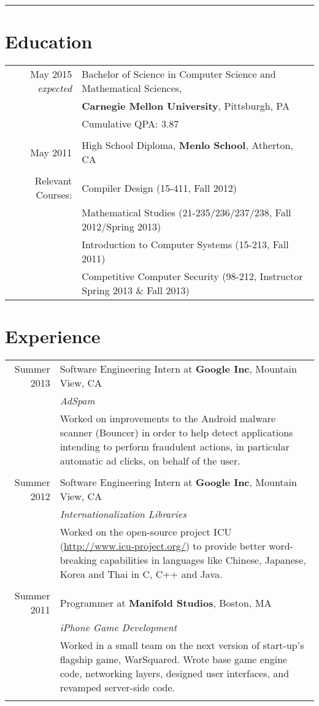 \documentclass[10pt]{article}
\newcommand{\job}[6]{#1 & #2 at \textbf{#3}, #4 \\ & \emph{#5} \\ & \footnotesize{#6}\\ \multicolumn{2}{c}{}\\ }
\begin{document}
\pagestyle{empty}
\par{\bigskip\par}
\hrule
\par{\par}

\section{Education}
\begin{tabular}{rl}
May 2015 {\em expected} & Bachelor of Science in Computer Science and Mathematical Sciences, 
\\ & \textbf{Carnegie Mellon University}, Pittsburgh, PA\\
& Cumulative QPA: 3.87 \\
 &\\
May 2011 & High School Diploma,
\textbf{Menlo School}, Atherton, CA\\
 &\\
Relevant Courses: & Compiler Design (15-411, Fall 2012) \\
& Mathematical Studies (21-235/236/237/238, Fall 2012/Spring 2013) \\
& Introduction to Computer Systems (15-213, Fall 2011) \\
& Competitive Computer Security (98-212, Instructor Spring 2013 \& Fall 2013)\end{tabular}

\section{Experience}
\begin{tabular}{r|p{11cm}}
\job{Summer 2013}
{Software Engineering Intern}
{Google Inc}
{Mountain View, CA}
{AdSpam}
{Worked on improvements to the Android malware
scanner (Bouncer) in order to help detect applications intending to 
perform fraudulent actions, in particular automatic ad clicks,
on behalf of the user.}
\job{Summer 2012}
{Software Engineering Intern}
{Google Inc}
{Mountain View, CA}
{Internationalization Libraries}
{Worked on the open-source project ICU (\url{http://www.icu-project.org/}) to provide better
word-breaking capabilities in languages like Chinese, Japanese, Korea and Thai in C, C++ and Java.}
\job{Summer 2011}
{Programmer}
{Manifold Studios}{Boston, MA}
{iPhone Game Development}
{Worked in a small team on the next version of start-up's
flagship game, WarSquared. 
Wrote base game engine code, networking layers, designed user interfaces, and revamped server-side code.}
\end{tabular}
\end{document}
